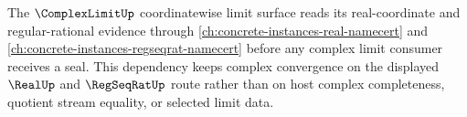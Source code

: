 The $\ComplexLimitUp$ coordinatewise limit surface reads its real-coordinate and regular-rational evidence through \autoref{ch:concrete-instances-real-namecert} and \autoref{ch:concrete-instances-regseqrat-namecert} before any complex limit consumer receives a seal. This dependency keeps complex convergence on the displayed $\RealUp$ and $\RegSeqRatUp$ route rather than on host complex completeness, quotient stream equality, or selected limit data.

